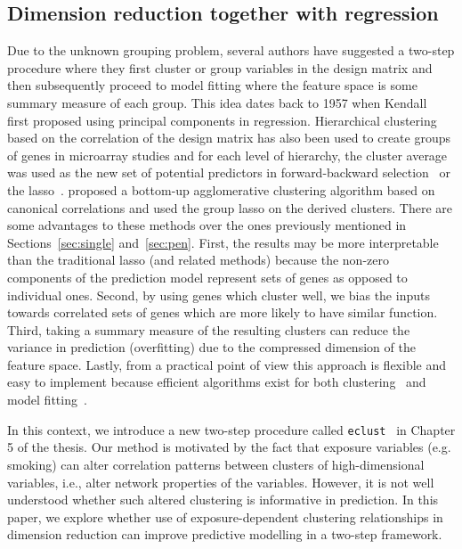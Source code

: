 \subsection{Dimension reduction together with regression}
Due to the unknown grouping problem, several authors have suggested a two-step procedure where they first cluster or group variables in the design matrix and then subsequently proceed to model fitting where the feature space is some summary measure of each group. 
This idea dates back to 1957 when Kendall~\citep{kendall1975multivariate} first proposed using principal components in regression. 
Hierarchical clustering based on the correlation of the design matrix has also been used to create groups of genes in microarray studies and for each level of hierarchy, the cluster average was used as the new set of potential predictors in forward-backward selection~\citep{hastie2001supervised} or the lasso~\citep{park2007averaged}.
\cite{buhlmann2013correlated} proposed a bottom-up agglomerative clustering algorithm based on canonical correlations and used the group lasso on the derived clusters. 
There are some advantages to these methods over the ones previously mentioned in Sections~\ref{sec:single} and~\ref{sec:pen}. 
First, the results may be more interpretable than the traditional lasso (and related methods) because the non-zero components of the prediction model represent sets of genes as opposed to individual ones. 
Second, by using genes which cluster well, we bias the inputs towards correlated sets of genes which are more likely to have similar function. 
Third, taking a summary measure of the resulting clusters can reduce the variance in prediction (overfitting) due to the compressed dimension of the feature space. 
Lastly, from a practical point of view this approach is flexible and easy to implement because efficient algorithms exist for both clustering~\citep{fastclust} and model fitting~\citep{friedman2010regularization,gglasso}. 

In this context, we introduce a new two-step procedure called \texttt{eclust}~\citep{bhatnagar2018analytic} in Chapter 5 of the thesis. Our method is motivated by the fact that exposure variables (e.g. smoking) can alter correlation patterns between clusters of high-dimensional variables, i.e., alter network properties of the variables. However, it is not well understood whether such altered clustering is informative in prediction. In this paper, we explore whether use of exposure-dependent clustering relationships in dimension reduction can improve predictive modelling in a two-step framework. 

